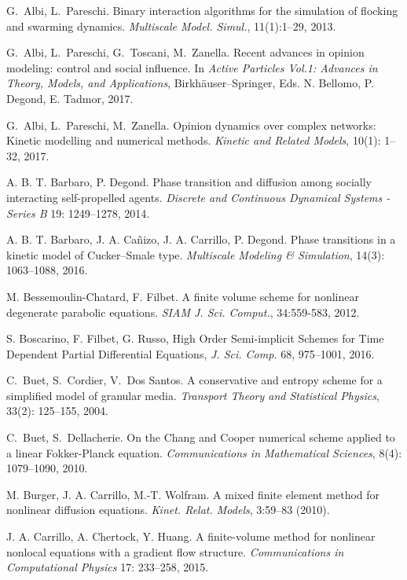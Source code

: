 \documentclass[a4paper]{article}
\theoremstyle{remark}\newtheorem{remark}{Remark}
\begin{document}
\begin{thebibliography}{99}

G.~Albi, L.~Pareschi. Binary interaction algorithms for the simulation of flocking and swarming dynamics.
 {\em Multiscale Model. Simul.}, 11(1):1--29, 2013.

G.~Albi, L.~Pareschi, G.~Toscani, M.~Zanella. Recent advances in opinion modeling: control and social influence. In \emph{Active Particles Vol.1: Advances in Theory, Models, and Applications}, Birkh{\"a}user--Springer, Eds. N. Bellomo, P. Degond, E. Tadmor, 2017.  

G.~Albi, L.~Pareschi, M.~Zanella. Opinion dynamics over complex networks: Kinetic modelling and numerical methods. \emph{Kinetic and Related Models}, 10(1): 1--32, 2017.

A. B. T. Barbaro, P. Degond. Phase transition and diffusion among socially interacting self-propelled agents. \emph{Discrete and Continuous Dynamical Systems - Series B} 19: 1249--1278, 2014.

A. B. T. Barbaro, J. A. Ca{\~n}izo, J. A. Carrillo, P. Degond. Phase transitions in a kinetic model of Cucker--Smale type. \emph{Multiscale Modeling \& Simulation}, 14(3): 1063--1088, 2016.  

M. Bessemoulin-Chatard, F. Filbet. A finite volume scheme for nonlinear degenerate parabolic equations. \emph{SIAM J. Sci. Comput.}, 34:559-583, 2012.

S. Boscarino, F. Filbet, G. Russo, {High Order Semi-implicit Schemes for Time Dependent Partial Differential Equations}, {\em J. Sci. Comp.} 68, 975--1001, 2016.

 C.~Buet, S.~Cordier, V.~Dos Santos. A conservative and entropy scheme for a simplified model of granular media. \emph{Transport Theory and Statistical Physics}, 33(2): 125--155, 2004.

 C.~Buet, S.~Dellacherie. On the Chang and Cooper numerical scheme applied to a linear Fokker-Planck equation. \emph{Communications in Mathematical Sciences}, 8(4): 1079--1090, 2010.

M. Burger, J. A. Carrillo, M.-T. Wolfram. A mixed finite element method for nonlinear diffusion equations. {\em Kinet. Relat. Models}, 3:59--83 (2010).


J. A. Carrillo, A. Chertock, Y. Huang. A finite-volume method for nonlinear nonlocal equations with a gradient flow structure. \emph{Communications in Computational Physics} 17: 233--258, 2015.


\end{thebibliography}
\end{document}
